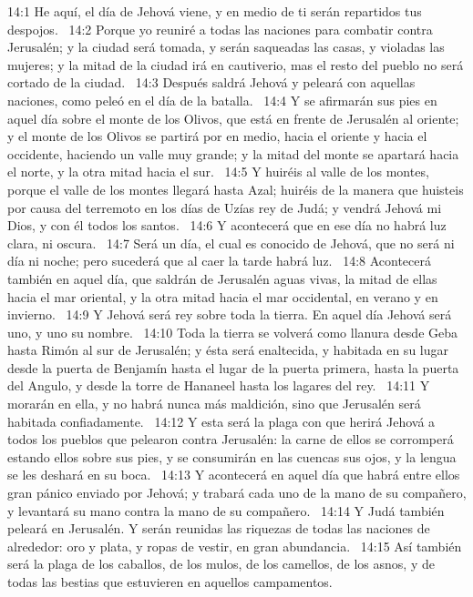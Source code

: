 14:1 He aquí, el día de Jehová viene, y en medio de ti serán repartidos tus despojos.  
14:2 Porque yo reuniré a todas las naciones para combatir contra Jerusalén; y la ciudad será tomada, y serán saqueadas las casas, y violadas las mujeres; y la mitad de la ciudad irá en cautiverio, mas el resto del pueblo no será cortado de la ciudad.  
14:3 Después saldrá Jehová y peleará con aquellas naciones, como peleó en el día de la batalla.  
14:4 Y se afirmarán sus pies en aquel día sobre el monte de los Olivos, que está en frente de Jerusalén al oriente; y el monte de los Olivos se partirá por en medio, hacia el oriente y hacia el occidente, haciendo un valle muy grande; y la mitad del monte se apartará hacia el norte, y la otra mitad hacia el sur.  
14:5 Y huiréis al valle de los montes, porque el valle de los montes llegará hasta Azal; huiréis de la manera que huisteis por causa del terremoto en los días de Uzías rey de Judá; y vendrá Jehová mi Dios, y con él todos los santos.  
14:6 Y acontecerá que en ese día no habrá luz clara, ni oscura.  
14:7 Será un día, el cual es conocido de Jehová, que no será ni día ni noche; pero sucederá que al caer la tarde habrá luz.  
14:8 Acontecerá también en aquel día, que saldrán de Jerusalén aguas vivas, la mitad de ellas hacia el mar oriental, y la otra mitad hacia el mar occidental, en verano y en invierno.  
14:9 Y Jehová será rey sobre toda la tierra. En aquel día Jehová será uno, y uno su nombre.  
14:10 Toda la tierra se volverá como llanura desde Geba hasta Rimón al sur de Jerusalén; y ésta será enaltecida, y habitada en su lugar desde la puerta de Benjamín hasta el lugar de la puerta primera, hasta la puerta del Angulo, y desde la torre de Hananeel hasta los lagares del rey.  
14:11 Y morarán en ella, y no habrá nunca más maldición, sino que Jerusalén será habitada confiadamente.  
14:12 Y esta será la plaga con que herirá Jehová a todos los pueblos que pelearon contra Jerusalén: la carne de ellos se corromperá estando ellos sobre sus pies, y se consumirán en las cuencas sus ojos, y la lengua se les deshará en su boca.  
14:13 Y acontecerá en aquel día que habrá entre ellos gran pánico enviado por Jehová; y trabará cada uno de la mano de su compañero, y levantará su mano contra la mano de su compañero.  
14:14 Y Judá también peleará en Jerusalén. Y serán reunidas las riquezas de todas las naciones de alrededor: oro y plata, y ropas de vestir, en gran abundancia.  
14:15 Así también será la plaga de los caballos, de los mulos, de los camellos, de los asnos, y de todas las bestias que estuvieren en aquellos campamentos.  
